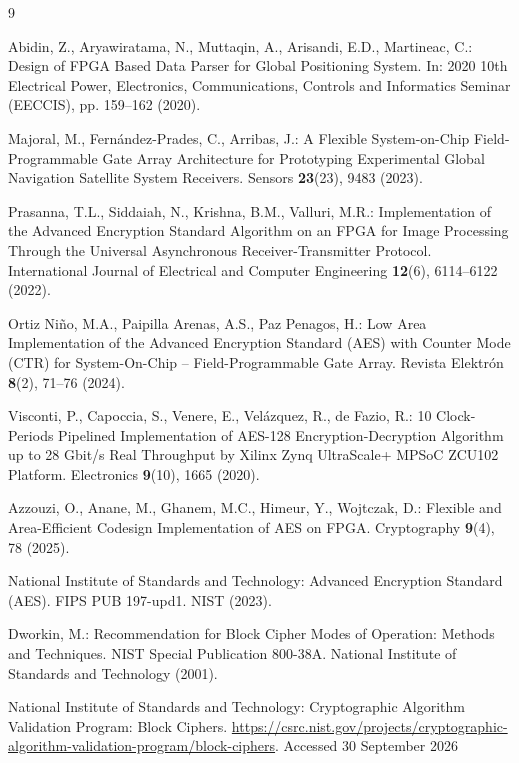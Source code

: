 \documentclass[runningheads]{llncs}
\begin{document}
\begin{thebibliography}{9}
\raggedright

Abidin, Z., Aryawiratama, N., Muttaqin, A., Arisandi, E.D., Martineac, C.: Design of FPGA Based Data Parser for Global Positioning System. In: 2020 10th Electrical Power, Electronics, Communications, Controls and Informatics Seminar (EECCIS), pp. 159--162 (2020). 

Majoral, M., Fern\'andez-Prades, C., Arribas, J.: A Flexible System-on-Chip Field-Programmable Gate Array Architecture for Prototyping Experimental Global Navigation Satellite System Receivers. Sensors \textbf{23}(23), 9483 (2023). 

Prasanna, T.L., Siddaiah, N., Krishna, B.M., Valluri, M.R.: Implementation of the Advanced Encryption Standard Algorithm on an FPGA for Image Processing Through the Universal Asynchronous Receiver-Transmitter Protocol. International Journal of Electrical and Computer Engineering \textbf{12}(6), 6114--6122 (2022). 

Ortiz Ni\~no, M.A., Paipilla Arenas, A.S., Paz Penagos, H.: Low Area Implementation of the Advanced Encryption Standard (AES) with Counter Mode (CTR) for System-On-Chip -- Field-Programmable Gate Array. Revista Elektr\'on \textbf{8}(2), 71--76 (2024). 

Visconti, P., Capoccia, S., Venere, E., Vel\'azquez, R., de Fazio, R.: 10 Clock-Periods Pipelined Implementation of AES-128 Encryption-Decryption Algorithm up to 28 Gbit/s Real Throughput by Xilinx Zynq UltraScale+ MPSoC ZCU102 Platform. Electronics \textbf{9}(10), 1665 (2020). 

Azzouzi, O., Anane, M., Ghanem, M.C., Himeur, Y., Wojtczak, D.: Flexible and Area-Efficient Codesign Implementation of AES on FPGA. Cryptography \textbf{9}(4), 78 (2025). 

National Institute of Standards and Technology: Advanced Encryption Standard (AES). FIPS PUB 197-upd1. NIST (2023). 

Dworkin, M.: Recommendation for Block Cipher Modes of Operation: Methods and Techniques. NIST Special Publication 800-38A. National Institute of Standards and Technology (2001). 

National Institute of Standards and Technology: Cryptographic Algorithm Validation Program: Block Ciphers. \url{https://csrc.nist.gov/projects/cryptographic-algorithm-validation-program/block-ciphers}. Accessed 30 September 2026

\end{thebibliography}
\end{document}
